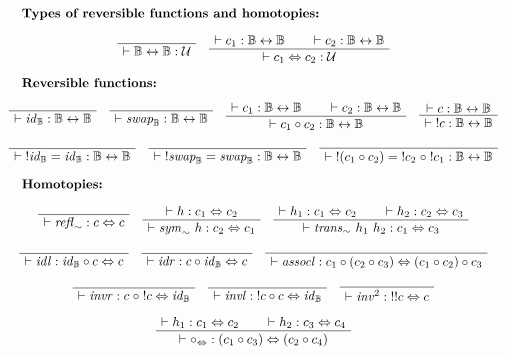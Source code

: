 \documentclass[format=acmlarge,review,natbib]{acmart}
\newcommand{\invc}[1]{!#1}
\newcommand{\compc}{\circ}
\newcommand{\reflh}{\mathit{refl}_{\sim}}
\newcommand{\symh}[1]{\mathit{sym}_{\sim}~#1}
\newcommand{\transh}[2]{\mathit{trans}_{\sim}~#1~#2}
\newcommand{\idc}{\mathit{id}}
\newcommand{\swapc}{\mathit{swap}}
\newcommand{\assocc}{\mathit{assocl}}
\newcommand{\invl}{\mathit{invl}}
\newcommand{\invr}{\mathit{invr}}
\newcommand{\invinv}{\mathit{inv}^2}
\newcommand{\idlc}{\mathit{idl}}
\newcommand{\idrc}{\mathit{idr}}
\newcommand{\compsim}{\compc_{\isotwo}}
\newcommand{\iso}{\leftrightarrow}
\newcommand{\isotwo}{\Leftrightarrow}
\newcommand{\boolt}{\mathbb{B}}
\newcommand{\univ}{\mathcal{U}}
\newcommand{\proves}{\vdash}
\newcommand{\jdg}[2]{\proves #1 : #2}
\newcommand{\jdge}[3]{\proves #1 = #2 : #3}
\begin{document}
\[\begin{array}{c}
  \noalign{\textbf{Types of reversible functions and homotopies:}} \\
  \AxiomC{}
  \UnaryInfC{$\jdg{\boolt\iso\boolt}{\univ}$}
  \DisplayProof
\quad
  \AxiomC{$\jdg{c_1}{\boolt\iso\boolt}$}
  \AxiomC{$\jdg{c_2}{\boolt\iso\boolt}$}
  \BinaryInfC{$\jdg{c_1 \isotwo c_2}{\univ}$}
  \DisplayProof
\\
\\
  \noalign{\textbf{Reversible functions:}} \\
  \AxiomC{}
  \UnaryInfC{$\jdg{\idc_{\boolt}}{\boolt\iso\boolt}$}
  \DisplayProof
\quad
  \AxiomC{}
  \UnaryInfC{$\jdg{\swapc_{\boolt}}{\boolt\iso\boolt}$}
  \DisplayProof
\quad
  \AxiomC{$\jdg{c_1}{\boolt\iso\boolt}$}
  \AxiomC{$\jdg{c_2}{\boolt\iso\boolt}$}
  \BinaryInfC{$\jdg{c_1 \compc c_2}{\boolt\iso\boolt}$}
  \DisplayProof
\quad
  \AxiomC{$\jdg{c}{\boolt\iso\boolt}$}
  \UnaryInfC{$\jdg{\;\invc{c}}{\boolt\iso\boolt}$}
  \DisplayProof
\\
\\
  \AxiomC{}
  \UnaryInfC{$\jdge{\;\invc{\idc_{\boolt}}}{\idc_{\boolt}}{\boolt\iso\boolt}$}
  \DisplayProof
\quad
  \AxiomC{}
  \UnaryInfC{$\jdge{\;\invc{\swapc_{\boolt}}}{\swapc_{\boolt}}{\boolt\iso\boolt}$}
  \DisplayProof
\quad
  \AxiomC{}
  \UnaryInfC{$\jdge{\;\invc{(c_1\compc c_2)}}{\;\invc{c_2}\;\compc\;\invc{c_1}}
                      {\boolt\iso\boolt}$}
  \DisplayProof
\\
\\
  \noalign{\textbf{Homotopies:}} \\
  \AxiomC{}
  \UnaryInfC{$\jdg{\reflh}{c \isotwo c}$}
  \DisplayProof
\quad
  \AxiomC{$\jdg{h}{c_1 \isotwo c_2}$}
  \UnaryInfC{$\jdg{\symh{h}}{c_2 \isotwo c_1}$}
  \DisplayProof
\quad
  \AxiomC{$\jdg{h_1}{c_1 \isotwo c_2}$}
  \AxiomC{$\jdg{h_2}{c_2 \isotwo c_3}$}
  \BinaryInfC{$\jdg{\transh{h_1}{h_2}}{c_1 \isotwo c_3}$}
  \DisplayProof
\\
\\
  \AxiomC{}
  \UnaryInfC{$\jdg{\idlc}{\idc_{\boolt} \compc c \isotwo c}$}
  \DisplayProof
\quad
  \AxiomC{}
  \UnaryInfC{$\jdg{\idrc}{c \compc \idc_{\boolt} \isotwo c}$}
  \DisplayProof
\quad
  \AxiomC{}
  \UnaryInfC{$\jdg{\assocc}
                   {c_1 \compc (c_2 \compc c_3) \isotwo (c_1 \compc c_2) \compc c_3}$}
  \DisplayProof
\\
\\
  \AxiomC{}
  \UnaryInfC{$\jdg{\invr}{c \;\compc \;\invc{c} \isotwo \idc_{\boolt}}$}
  \DisplayProof
\quad
  \AxiomC{}
  \UnaryInfC{$\jdg{\invl}{\;\invc{c} \compc c \isotwo \idc_{\boolt}}$}
  \DisplayProof
\quad
  \AxiomC{}
  \UnaryInfC{$\jdg{\invinv}{\;\invc{\invc{c}}  \isotwo c}$}
  \DisplayProof
\\
\\
  \AxiomC{$\jdg{h_1}{c_1 \isotwo c_2}$}
  \AxiomC{$\jdg{h_2}{c_3 \isotwo c_4}$}
  \BinaryInfC{$\jdg{\compsim}{(c_1 \compc c_3) \isotwo (c_2 \compc c_4)}$}
  \DisplayProof
\end{array}\]
\end{document}
